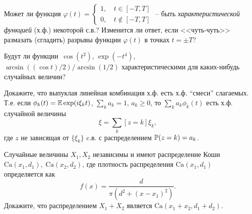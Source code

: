 \begin{comment}
\begin{ordre}

Рассмотрим следующие случайные величины: 
$$
\xi_i=\begin{cases}
1, & \text{ $i$-й столбец нулевой}, \\
0, & \text{ иначе }.
\end{cases} 
$$
Тогда $\xi_i\in\Be$, $\xi=\xi_1+\ldots +\xi_n$. 

Имеет место следующее мультипликативное свойство:
$$
\psi_{\xi}(z)=\bigl[\psi_{\xi_i}(z)\bigr]^n
$$

\end{ordre}
\end{comment}

\begin{problem}
Может ли функция $\varphi(t)=\begin{cases}1,\quad t\in[-T,T]\\
0,\quad t\notin[-T,T] \end{cases}$ -- 
быть \textit {характеристической функцией} (х.ф.) некоторой с.в.? Изменится ли ответ, если <<чуть-чуть>> размазать (сгладить) разрывы функции 
$\varphi(t)$ в точках $t=\pm T$? 
\end{problem}

\begin{comment}
\begin{ordre}
Характеристическая функция обладает следующими свойствами:
\begin{fixme}
Iterate the properties 
\end{fixme}
\end{ordre}
\end{comment}


\begin{problem}
Будут ли функции~$\cos(t^2)$, $\exp(-t^4)$, $\arcsin((\cos t)/2) / \arcsin(1/2)$ характеристическими для каких-нибудь случайных величин?
\end{problem}

\begin{problem}

Докажите, что выпуклая линейная комбинация х.ф. есть х.ф.  ``смеси'' слагаемых. Т.е. если $\phi_{k}(t) = \mathrm{{\mathbb E}} \exp (i\xi_k t)$, $\sum_k a_k = 1$, $a_k \geq 0$,  то $\sum_k a_k \phi_{k}(t)$ есть х.ф. случайной величины
\[
\xi = \sum_k [z = k] \xi_k,
\]
где $z$ не зависящая от $\{\xi_k\}$ c.в. с распределением $\mathrm{{\mathbb P}}(z=k) = a_k$.
\end{problem}


\begin{problem}
Случайные величины $X_1, X_2$ независимы и имеют распределение Коши $\text{Ca}(x_1, d_1), \; \text{Ca}(x_2, d_2)$, где плотность распределения  $\text{Ca}(x_1, d_1)$ определяется как    
\[
f(x) = \frac{d}{\pi(d^2 + (x-x_1)^2)}.
\]
Докажите, что распределением $X_1 + X_2$ является $\text{Ca}(x_1+x_2, d_1+d_2)$.
\end{problem}

